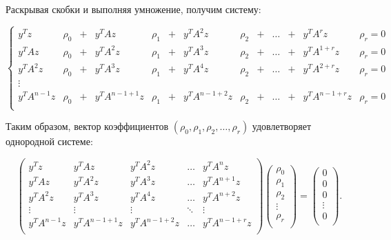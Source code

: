 Раскрывая скобки и выполняя умножение, получим систему:

	$$
		\left \{
			\begin{array}{ccccccccccccc}
				y^T z         & \rho_0 & + & y^T A z         & \rho_1 & + & y^T A^2 z       & \rho_2 & + & \dots & + & y^T A^r z & \rho_r = 0 \\
				y^T A z       & \rho_0 & + & y^T A^2 z       & \rho_1 & + & y^T A^3 z       & \rho_2 & + & \dots & + & y^T A^{1+r} z & \rho_r = 0 \\
				y^T A^2 z     & \rho_0 & + & y^T A^3 z       & \rho_1 & + & y^T A^4 z       & \rho_2 & + & \dots & + & y^T A^{2+r} z & \rho_r = 0 \\
				\vdots \\
				y^T A^{n-1} z & \rho_0 & + & y^T A^{n-1+1} z & \rho_1 & + & y^T A^{n-1+2} z & \rho_2 & + & \dots & + & y^T A^{n-1+r} z & \rho_r = 0 \\
			\end{array}
		\right .
	$$

Таким образом, вектор коэффициентов $( \rho_0, \rho_1, \rho_2, \dots, \rho_r )$ удовлетворяет однородной системе:

	$$
		\begin{pmatrix}
			y^T z         & y^T A z         & y^T A^2 z       & \ldots & y^T A^n z \\
			y^T A z       & y^T A^2 z       & y^T A^3 z       & \ldots & y^T A^{n+1} z \\
			y^T A^2 z     & y^T A^3 z       & y^T A^4 z       & \ldots & y^T A^{n+2} z \\
			\vdots        & \vdots          & \vdots          & \ddots & \vdots \\
			y^T A^{n-1} z & y^T A^{n-1+1} z & y^T A^{n-1+2} z & \ldots & y^T A^{n-1+r} z \\
		\end{pmatrix}
		\begin{pmatrix}
			\rho_0 \\
			\rho_1 \\
			\rho_2 \\
			\vdots \\
			\rho_r \\
		\end{pmatrix}
		=
		\begin{pmatrix}
			0 \\
			0 \\
			0 \\
			\vdots \\
			0 \\
		\end{pmatrix}
		.
	$$

